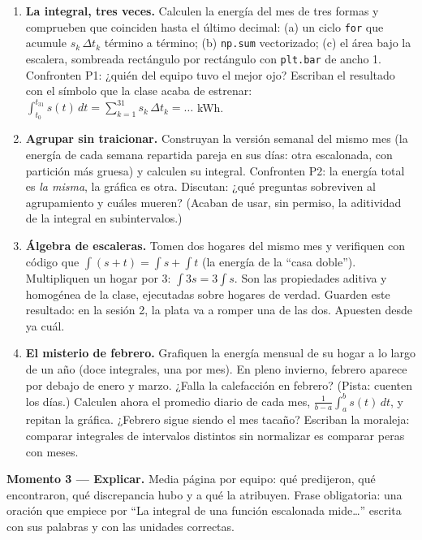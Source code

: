\documentclass[12pt,letterpaper]{article}
\begin{document}
\begin{enumerate}[label=\arabic*.]
    \item \textbf{La integral, tres veces.} Calculen la energía del mes de tres formas y comprueben que coinciden hasta el último decimal: (a) un ciclo \texttt{for} que acumule $s_k\,\Delta t_k$ término a término; (b) \texttt{np.sum} vectorizado; (c) el área bajo la escalera, sombreada rectángulo por rectángulo con \texttt{plt.bar} de ancho 1. Confronten P1: ¿quién del equipo tuvo el mejor ojo? Escriban el resultado con el símbolo que la clase acaba de estrenar: $\int_{t_0}^{t_{31}} s(t)\,dt = \sum_{k=1}^{31}s_k\,\Delta t_k = \ldots$ kWh.
    \item \textbf{Agrupar sin traicionar.} Construyan la versión semanal del mismo mes (la energía de cada semana repartida pareja en sus días: otra escalonada, con partición más gruesa) y calculen su integral. Confronten P2: la energía total es \emph{la misma}, la gráfica es otra. Discutan: ¿qué preguntas sobreviven al agrupamiento y cuáles mueren? (Acaban de usar, sin permiso, la aditividad de la integral en subintervalos.)
    \item \textbf{Álgebra de escaleras.} Tomen dos hogares del mismo mes y verifiquen con código que $\int(s+t)=\int s+\int t$ (la energía de la ``casa doble''). Multipliquen un hogar por 3: $\int 3s=3\int s$. Son las propiedades aditiva y homogénea de la clase, ejecutadas sobre hogares de verdad. Guarden este resultado: en la sesión 2, la plata va a romper una de las dos. Apuesten desde ya cuál.
    \item \textbf{El misterio de febrero.} Grafiquen la energía mensual de su hogar a lo largo de un año (doce integrales, una por mes). En pleno invierno, febrero aparece por debajo de enero y marzo. ¿Falla la calefacción en febrero? (Pista: cuenten los días.) Calculen ahora el promedio diario de cada mes, $\frac{1}{b-a}\int_a^b s(t)\,dt$, y repitan la gráfica. ¿Febrero sigue siendo el mes tacaño? Escriban la moraleja: comparar integrales de intervalos distintos sin normalizar es comparar peras con meses.
\end{enumerate}

\textbf{Momento 3 --- Explicar.} Media página por equipo: qué predijeron, qué encontraron, qué discrepancia hubo y a qué la atribuyen. Frase obligatoria: una oración que empiece por ``La integral de una función escalonada mide\ldots'' escrita con sus palabras y con las unidades correctas.
\end{document}
